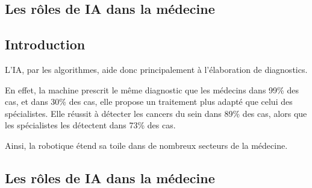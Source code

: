 \begin{titlepage}
	\begin{center}
		\chapter{Les rôles de \textbf{IA} dans la médecine}
		\minitoc

		\vspace{5cm}
		\pgfspectra[element=He,absorption]
	\end{center}
	\vfill %
\end{titlepage}
\pagestyle{monstyle}\setcounter{page}{3}

\section{Introduction}
         L'IA, par les algorithmes, aide donc principalement à l'élaboration de
         diagnostics.

         En effet, la machine prescrit le même diagnostic que les
         médecins dans 99\% des cas, et dans 30\% des cas, elle propose un
         traitement plus adapté que celui des spécialistes. Elle réussit à
         détecter les cancers du sein dans 89\% des cas, alors que les
         spécialistes les détectent dans 73\% des cas.

         Ainsi, la robotique étend sa toile dans de nombreux secteurs de la médecine.
\section{Les rôles de \textbf{IA} dans la médecine}

